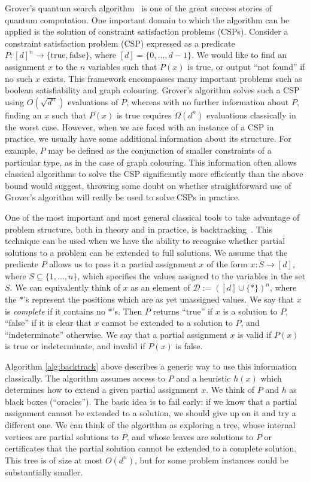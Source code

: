 \documentclass[11pt]{article}
\begin{document}
Grover's quantum search algorithm~\cite{grover97} is one of the great success stories of quantum computation. One important domain to which the algorithm can be applied is the solution of constraint satisfaction problems (CSPs). Consider a constraint satisfaction problem (CSP) expressed as a predicate $P:[d]^n \rightarrow \{\text{true},\text{false}\}$, where $[d] = \{0,\dots,d-1\}$. We would like to find an assignment $x$ to the $n$ variables such that $P(x)$ is true, or output ``not found'' if no such $x$ exists. This framework encompasses many important problems such as boolean satisfiability and graph colouring. Grover's algorithm solves such a CSP using $O(\sqrt{d^n})$ evaluations of $P$, whereas with no further information about $P$, finding an $x$ such that $P(x)$ is true requires $\Omega(d^n)$ evaluations classically in the worst case.
However, when we are faced with an instance of a CSP in practice, we usually have some additional information about its structure. For example, $P$ may be defined as the conjunction of smaller constraints of a particular type, as in the case of graph colouring. This information often allows classical algorithms to solve the CSP significantly more efficiently than the above bound would suggest, throwing some doubt on whether straightforward use of Grover's algorithm will really be used to solve CSPs in practice.

One of the most important and most general classical tools to take advantage of problem structure, both in theory and in practice, is backtracking~\cite{vanbeek06}. This technique can be used when we have the ability to recognise whether partial solutions to a problem can be extended to full solutions. We assume that the predicate $P$ allows us to pass it a partial assignment $x$ of the form $x:S \rightarrow [d]$, where $S \subseteq \{1,\dots,n\}$, which specifies the values assigned to the variables in the set $S$. We can equivalently think of $x$ as an element of $\mathcal{D} := ([d] \cup \{\ast\})^n$, where the $\ast$'s represent the positions which are as yet unassigned values. We say that $x$ is {\em complete} if it contains no $\ast$'s. Then $P$ returns ``true'' if $x$ is a solution to $P$, ``false'' if it is clear that $x$ cannot be extended to a solution to $P$, and ``indeterminate'' otherwise. We say that a partial assignment $x$ is valid if $P(x)$ is true or indeterminate, and invalid if $P(x)$ is false.

Algorithm \ref{alg:backtrack} above describes a generic way to use this information classically. The algorithm assumes access to $P$ and a heuristic $h(x)$ which determines how to extend a given partial assignment $x$. We think of $P$ and $h$ as black boxes (``oracles''). The basic idea is to fail early: if we know that a partial assignment cannot be extended to a solution, we should give up on it and try a different one. We can think of the algorithm as exploring a tree, whose internal vertices are partial solutions to $P$, and whose leaves are solutions to $P$ or certificates that the partial solution cannot be extended to a complete solution. This tree is of size at most $O(d^n)$, but for some problem instances could be substantially smaller. 
\end{document}
